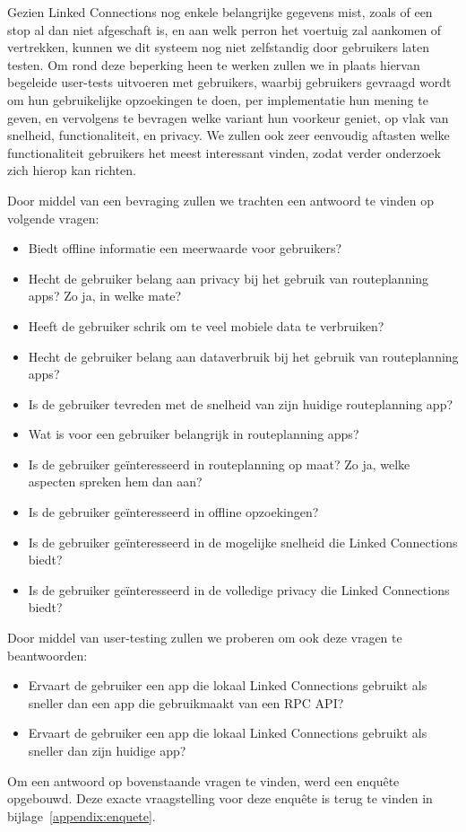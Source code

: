 Gezien Linked Connections nog enkele belangrijke gegevens mist, zoals of een stop al dan niet afgeschaft is, en aan welk perron het voertuig zal aankomen of vertrekken, kunnen we dit systeem nog niet zelfstandig door gebruikers laten testen. Om rond deze beperking heen te werken zullen we in plaats hiervan begeleide user-tests uitvoeren met gebruikers, waarbij gebruikers gevraagd wordt om hun gebruikelijke opzoekingen te doen, per implementatie hun mening te geven, en vervolgens te bevragen welke variant hun voorkeur geniet, op vlak van snelheid, functionaliteit, en privacy.
We zullen ook zeer eenvoudig aftasten welke functionaliteit gebruikers het meest interessant vinden, zodat verder onderzoek zich hierop kan richten.

Door middel van een bevraging zullen we trachten een antwoord te vinden op volgende vragen:
\begin{itemize}
	\item Biedt offline informatie een meerwaarde voor gebruikers?
	\item Hecht de gebruiker belang aan privacy bij het gebruik van routeplanning apps? Zo ja, in welke mate?
	\item Heeft de gebruiker schrik om te veel mobiele data te verbruiken?
	\item Hecht de gebruiker belang aan dataverbruik bij het gebruik van routeplanning apps?
	\item Is de gebruiker tevreden met de snelheid van zijn huidige routeplanning app?
	\item Wat is voor een gebruiker belangrijk in routeplanning apps?
	\item Is de gebruiker geïnteresseerd in routeplanning op maat? Zo ja, welke aspecten spreken hem dan aan?
	\item Is de gebruiker geïnteresseerd in offline opzoekingen?
	\item Is de gebruiker geïnteresseerd in de mogelijke snelheid die Linked Connections biedt?
	\item Is de gebruiker geïnteresseerd in de volledige privacy die Linked Connections biedt?
\end{itemize}

Door middel van user-testing zullen we proberen om ook deze vragen te beantwoorden:
\begin{itemize}
	\item Ervaart de gebruiker een app die lokaal Linked Connections gebruikt als sneller dan een app die gebruikmaakt van een RPC API?
	\item Ervaart de gebruiker een app die lokaal Linked Connections gebruikt als sneller dan zijn huidige app?
\end{itemize}

Om een antwoord op bovenstaande vragen te vinden, werd een enquête opgebouwd. Deze exacte vraagstelling voor deze enquête is terug te vinden in bijlage~\ref{appendix:enquete}.